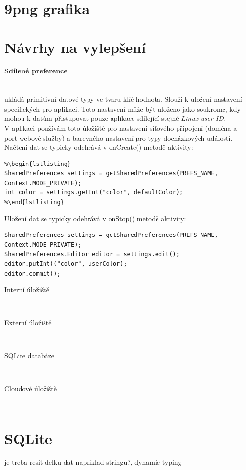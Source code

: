 \documentclass{bakalarka}
\begin{document}
\section{9png grafika}
\section{Návrhy na vylepšení}

\paragraph{Sdílené preference}\hfill \\ukládá primitivní datové typy ve tvaru klíč-hodnota. Slouží k uložení nastavení specifických pro aplikaci. Toto nastavení může být uloženo jako soukromé, kdy mohou k datům přistupovat pouze aplikace sdílející stejné \emph{Linux user ID}.\\ V aplikaci používám toto úložiště pro nastavení síťového připojení (doména a port webové služby) a barevného nastavení pro typy docházkových událostí.\\
Načtení dat se typicky odehrává v onCreate() metodě aktivity:
\begin{verbatim}
%\begin{lstlisting}
SharedPreferences settings = getSharedPreferences(PREFS_NAME, 
Context.MODE_PRIVATE);
int color = settings.getInt("color", defaultColor);
%\end{lstlisting}
\end{verbatim}
\noindent
Uložení dat se typicky odehrává v onStop() metodě aktivity:
\begin{verbatim}
SharedPreferences settings = getSharedPreferences(PREFS_NAME, 
Context.MODE_PRIVATE);
SharedPreferences.Editor editor = settings.edit();
editor.putInt(("color", userColor);
editor.commit();
\end{verbatim}

\begin{description}
\item [Interní úložiště]\hfill \\
\item [Externí úložiště]\hfill \\
\item [SQLite databáze]\hfill \\
\item [Cloudové úložiště]\hfill \\
\end{description}

\section{SQLite}
je treba resit delku dat napriklad stringu?, dynamic typing
\end{document}
